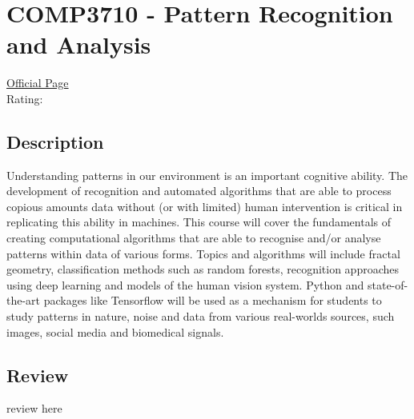 \hypertarget{COMP3710}{\section{COMP3710 - Pattern Recognition and Analysis}}

\large
\textcolor{turbo_purple}{\href{https://my.uq.edu.au/programs-courses/course.html?course_code=COMP3710}{Official Page}} \\
Rating: \cstar\cstar\cstar\cstar\ostar

\normalsize
\subsection*{Description}
Understanding patterns in our environment is an important cognitive ability.
The development of recognition and automated algorithms that are able to process copious amounts data without (or with limited) human intervention is critical in replicating this ability in machines.
This course will cover the fundamentals of creating computational algorithms that are able to recognise and/or analyse patterns within data of various forms.
Topics and algorithms will include fractal geometry, classification methods such as random forests, recognition approaches using deep learning and models of the human vision system.
Python and state-of-the-art packages like Tensorflow will be used as a mechanism for students to study patterns in nature, noise and data from various real-worlds sources, such images, social media and biomedical signals.

\subsection*{Review}
review here
